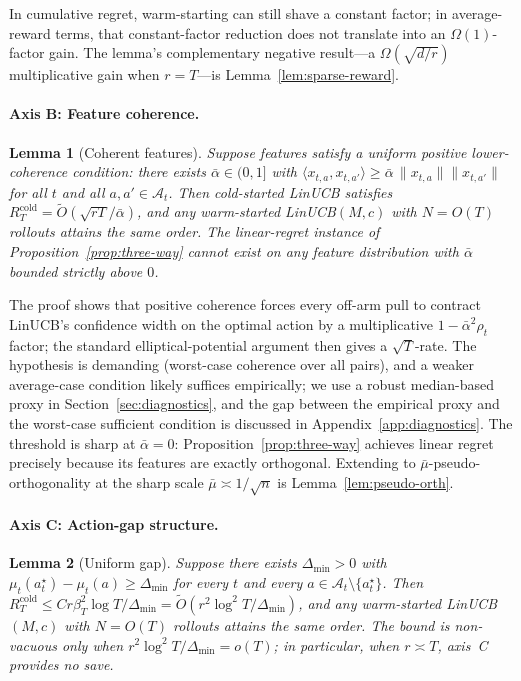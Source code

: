 \documentclass{article}
\newtheorem{lemma}{Lemma}
\theoremstyle{definition}
\theoremstyle{remark}
\theoremstyle{remark}
\begin{document}
In cumulative regret, warm-starting can still shave a constant factor; in
average-reward terms, that constant-factor reduction does not translate into
an $\Omega(1)$-factor gain. The lemma's complementary negative result---a
$\Omega(\sqrt{d/r})$ multiplicative gain when $r\!=\!T$---is
Lemma~\ref{lem:sparse-reward}.

\paragraph{Axis B: Feature coherence.}

\begin{lemma}[Coherent features]
\label{lem:coherent-suffices}
Suppose features satisfy a uniform positive lower-coherence condition: there
exists $\bar\alpha\in(0,1]$ with
$\langle x_{t,a},x_{t,a'}\rangle \ge \bar\alpha\,\|x_{t,a}\|\|x_{t,a'}\|$
for all $t$ and all $a,a'\in\mathcal A_t$. Then cold-started LinUCB satisfies
$R_T^{\mathrm{cold}}=\widetilde O(\sqrt{rT}/\bar\alpha)$, and any
warm-started LinUCB$(M,c)$ with $N=O(T)$ rollouts attains the same order. The
linear-regret instance of Proposition~\ref{prop:three-way} \emph{cannot exist}
on any feature distribution with $\bar\alpha$ bounded strictly above $0$.
\end{lemma}

The proof shows that positive coherence forces every off-arm pull to contract
LinUCB's confidence width on the optimal action by a multiplicative
$1-\bar\alpha^2\rho_t$ factor; the standard elliptical-potential argument
\cite{abbasi2011improved} then gives a $\sqrt T$-rate. The hypothesis is
demanding (worst-case coherence over all pairs), and a weaker average-case
condition likely suffices empirically; we use a robust median-based proxy in
Section~\ref{sec:diagnostics}, and the gap between the empirical proxy and
the worst-case sufficient condition is discussed in
Appendix~\ref{app:diagnostics}. The threshold is sharp at $\bar\alpha=0$:
Proposition~\ref{prop:three-way} achieves linear regret precisely because its
features are exactly orthogonal. Extending to
$\bar\mu$-pseudo-orthogonality at the sharp scale $\bar\mu\asymp 1/\sqrt n$
is Lemma~\ref{lem:pseudo-orth}.

\paragraph{Axis C: Action-gap structure.}

\begin{lemma}[Uniform gap]
\label{lem:gap-suffices}
Suppose there exists $\Delta_{\min}>0$ with
$\mu_t(a_t^\star)-\mu_t(a)\ge\Delta_{\min}$ for every $t$ and every
$a\in\mathcal A_t\setminus\{a_t^\star\}$. Then $R_T^{\mathrm{cold}}\le
Cr\beta_T^2\log T/\Delta_{\min}=\widetilde O(r^2\log^2 T/\Delta_{\min})$, and
any warm-started LinUCB$(M,c)$ with $N=O(T)$ rollouts attains the same order.
The bound is non-vacuous only when $r^2\log^2 T/\Delta_{\min}=o(T)$; in
particular, when $r\asymp T$, axis~C provides no save.
\end{lemma}
\end{document}
